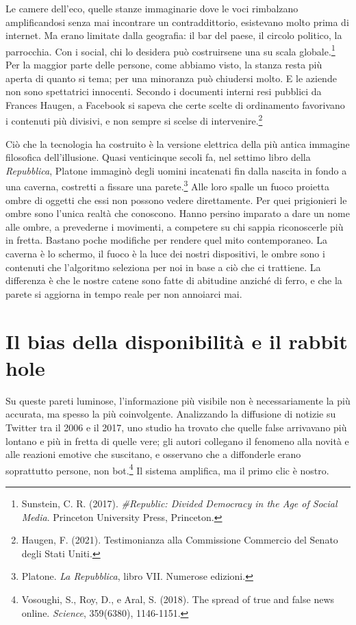 Le camere dell'eco, quelle stanze immaginarie dove le voci rimbalzano amplificandosi senza mai incontrare un contraddittorio, esistevano molto prima di internet. Ma erano limitate dalla geografia: il bar del paese, il circolo politico, la parrocchia. Con i social, chi lo desidera può costruirsene una su scala globale.\footnote{Sunstein, C. R. (2017). \textit{\#Republic: Divided Democracy in the Age of Social Media}. Princeton University Press, Princeton.} Per la maggior parte delle persone, come abbiamo visto, la stanza resta più aperta di quanto si tema; per una minoranza può chiudersi molto. E le aziende non sono spettatrici innocenti. Secondo i documenti interni resi pubblici da Frances Haugen, a Facebook si sapeva che certe scelte di ordinamento favorivano i contenuti più divisivi, e non sempre si scelse di intervenire.\footnote{Haugen, F. (2021). Testimonianza alla Commissione Commercio del Senato degli Stati Uniti.}

Ciò che la tecnologia ha costruito è la versione elettrica della più antica immagine filosofica dell'illusione. Quasi venticinque secoli fa, nel settimo libro della \textit{Repubblica}, Platone immaginò degli uomini incatenati fin dalla nascita in fondo a una caverna, costretti a fissare una parete.\footnote{Platone. \textit{La Repubblica}, libro VII. Numerose edizioni.} Alle loro spalle un fuoco proietta ombre di oggetti che essi non possono vedere direttamente. Per quei prigionieri le ombre sono l'unica realtà che conoscono. Hanno persino imparato a dare un nome alle ombre, a prevederne i movimenti, a competere su chi sappia riconoscerle più in fretta. Bastano poche modifiche per rendere quel mito contemporaneo. La caverna è lo schermo, il fuoco è la luce dei nostri dispositivi, le ombre sono i contenuti che l'algoritmo seleziona per noi in base a ciò che ci trattiene. La differenza è che le nostre catene sono fatte di abitudine anziché di ferro, e che la parete si aggiorna in tempo reale per non annoiarci mai.

\section{Il bias della disponibilità e il rabbit hole}

Su queste pareti luminose, l'informazione più visibile non è necessariamente la più accurata, ma spesso la più coinvolgente. Analizzando la diffusione di notizie su Twitter tra il 2006 e il 2017, uno studio ha trovato che quelle false arrivavano più lontano e più in fretta di quelle vere; gli autori collegano il fenomeno alla novità e alle reazioni emotive che suscitano, e osservano che a diffonderle erano soprattutto persone, non bot.\footnote{Vosoughi, S., Roy, D., e Aral, S. (2018). The spread of true and false news online. \textit{Science}, 359(6380), 1146-1151.} Il sistema amplifica, ma il primo clic è nostro.

